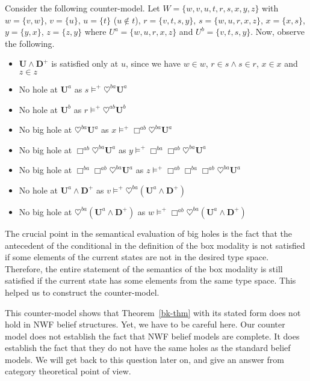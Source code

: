 \documentclass{article}
\begin{document}
Consider the following counter-model. Let $W = \{ w, v, u, t, r, s, x, y, z \}$ with $w = \{ v, w \}$, $v = \{ u \}$, $u = \{ t \}$ ($u \notin t$), $r = \{ v, t, s, y \}$, $s = \{ w, u, r, x, z \}$, $x = \{ x, s\}$, $y = \{ y, x \}$, $z = \{ z, y \}$ where $U^a = \{ w, u, r, x, z \}$ and $U^b = \{ v, t, s, y \}$. Now, observe the following.

\begin{itemize}
\item $\mathbf{U} \wedge \mathbf{D}^+$ is satisfied only at $u$, since we have $w \in w$, $r \in s \wedge s\in r$, $x \in x$ and $z \in z$
\item No hole at $\mathbf{U}^a$ as $s \models^+ \heartsuit^{ba} \mathbf{U}^a$
\item No hole at $\mathbf{U}^b$ as $r \models^+ \heartsuit^{ab} \mathbf{U}^b$
\item No big hole at $\heartsuit^{ba} \mathbf{U}^a$ as $x \models^+ \Box^{ab} \heartsuit^{ba} \mathbf{U}^a$
\item No big hole at $\Box^{ab} \heartsuit^{ba} \mathbf{U}^a$ as $y \models^+ \Box^{ba} \Box^{ab} \heartsuit^{ba} \mathbf{U}^a$
\item No big hole at $\Box^{ba} \Box^{ab} \heartsuit^{ba} \mathbf{U}^a$ as $z \models^+ \Box^{ab} \Box^{ba} \Box^{ab} \heartsuit^{ba} \mathbf{U}^a$
\item No hole at $\mathbf{U}^a \wedge \mathbf{D}^+$ as $v \models^+ \heartsuit^{ba} (\mathbf{U}^a \wedge \mathbf{D}^+)$
\item No big hole at $\heartsuit^{ba} (\mathbf{U}^a \wedge \mathbf{D}^+)$ as $w \models^+ \Box^{ab} \heartsuit^{ba} (\mathbf{U}^a \wedge \mathbf{D}^+)$
\end{itemize}

The crucial point in the semantical evaluation of big holes is the fact that the antecedent of the conditional in the definition of the box modality is not satisfied if some elements of the current states are not in the desired type space. Therefore, the entire statement of the semantics of the box modality is still satisfied if the current state has some elements from the same type space. This helped us to construct the counter-model.

This counter-model shows that Theorem~\ref{bk-thm} with its stated form does not hold in NWF belief structures. Yet, we have to be careful here. Our counter model does not establish the fact that NWF belief models are complete. It does establish the fact that they do not have the same holes as the standard belief models. We will get back to this question later on, and give an answer from category theoretical point of view.
\end{document}
